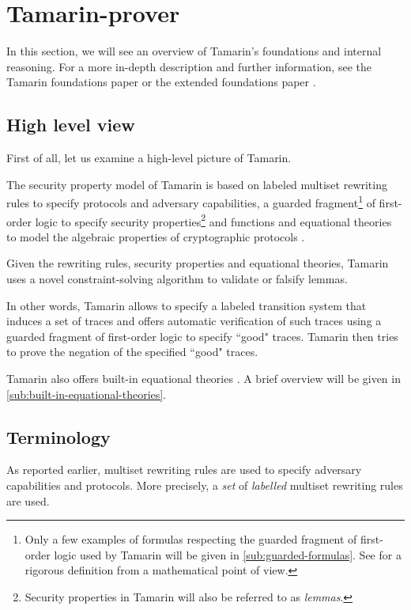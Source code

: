 \section{Tamarin-prover}
In this section, we will see an overview of Tamarin's foundations and internal reasoning.
For a more in-depth description and further information, see the Tamarin foundations paper \cite{TamarinFoundations} or the extended foundations paper \cite{TamarinFoundationsExtended}.

\subsection{High level view}
First of all, let us examine a high-level picture of Tamarin.

The security property model of Tamarin is based on labeled multiset rewriting rules to specify protocols and adversary capabilities, a guarded fragment\footnote{Only a few examples of formulas respecting the guarded fragment of first-order logic used by Tamarin will be given in \cref{sub:guarded-formulas}. See \cite{FragmentFirstOrderLogicPaper} for a rigorous definition from a mathematical point of view.} of first-order logic to specify security properties\footnote{Security properties in Tamarin will also be referred to as \textit{lemmas}.} and functions and equational theories to model the algebraic properties of cryptographic protocols \cite{TamarinFoundations}.

Given the rewriting rules, security properties and equational theories, Tamarin uses a novel constraint-solving algorithm to validate or falsify lemmas.

In other words, Tamarin allows to specify a labeled transition system that induces a set of traces and offers automatic verification of such traces using a guarded fragment of first-order logic to specify ``good" traces. Tamarin then tries to prove the negation of the specified ``good" traces.

Tamarin also offers built-in equational theories \cite{TamarinProverManual}. A brief overview will be given in \cref{sub:built-in-equational-theories}.

\subsection{Terminology}
As reported earlier, multiset rewriting rules are used to specify adversary capabilities and protocols. More precisely, a \textit{set} of \textit{labelled} multiset rewriting rules are used.

